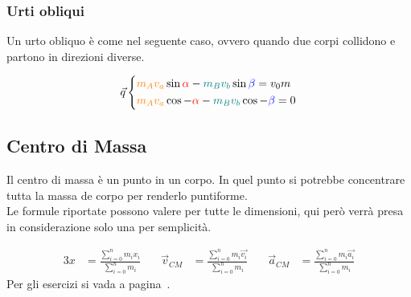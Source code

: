 \subsubsection{Urti obliqui}
Un urto obliquo è come nel seguente caso, ovvero quando due corpi collidono e partono in direzioni
diverse.\\
\begin{center}
\end{center}
\begin{equation*}
  \vec{q}
  \begin{cases*}
    \mathcolor{orange}{m_A}\mathcolor{orange}{v_a}\sin\mathcolor{red}{\alpha}-
    \mathcolor{teal}{m_B}\mathcolor{teal}{v_b}\sin\mathcolor{blue}{\beta} = v_0m\\
    \mathcolor{orange}{m_A}\mathcolor{orange}{v_a}\cos-\mathcolor{red}{\alpha}-
    \mathcolor{teal}{m_B}\mathcolor{teal}{v_b}\cos-\mathcolor{blue}{\beta} = 0
  \end{cases*}
\end{equation*}

\subsection{Centro di Massa}\label{subsec:dinamica:cm}
Il centro di massa è un punto in un corpo. In quel punto si potrebbe concentrare tutta la massa de 
corpo per renderlo puntiforme.\\
Le formule riportate possono valere per tutte le dimensioni, qui però
verrà presa in considerazione solo una per semplicità.

\begin{alignat*}{3}
  x &= \frac{\sum\limits_{i=0}^{n} m_ix_i}{\sum\limits_{i=0}^{n} m_i} &\quad
  \vec{v}_{CM} &= \frac{\sum\limits_{i=0}^{n} m_i\vec{v_i}}{\sum\limits_{i=0}^{n} m_i} &\quad
  \vec{a}_{CM} &= \frac{\sum\limits_{i=0}^{n} m_i\vec{a_i}}{\sum\limits_{i=0}^{n} m_i}
\end{alignat*}
Per gli esercizi si vada a pagina~\pageref{ex:cm}.

